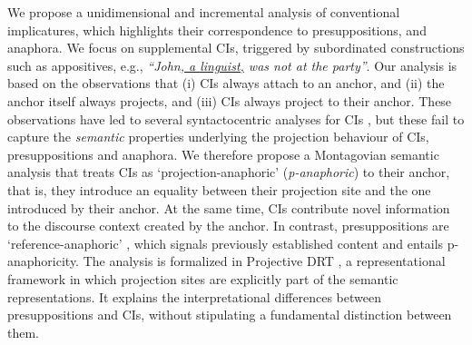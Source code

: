 \documentclass[letterpaper,11pt]{article}
\begin{document}
We propose a unidimensional and incremental analysis of conventional
implicatures, which highlights their correspondence to presuppositions, and
anaphora.  We focus on supplemental CIs, triggered by subordinated
constructions such as appositives, e.g., \emph{``John\underline{,
a linguist,} was not at the party''}. Our analysis is based on the
observations that (i) CIs always attach to an anchor, and (ii) the anchor
itself always projects, and (iii) CIs always project to their anchor.  These
observations have led to several syntactocentric analyses for CIs
\cite[e.g.,][]{nouwen2007appositives-short,schlenker2013supplements,nouwen2014note-short},
but these fail to capture the \emph{semantic} properties underlying the
projection behaviour of CIs, presuppositions and anaphora. We therefore
propose a Montagovian semantic analysis that treats CIs as
`projection-anaphoric' (\emph{p-anaphoric}) to their anchor, that is, they
introduce an equality between their projection site and the one introduced
by their anchor. At the same time, CIs contribute novel information to the
discourse context created by the anchor. In contrast, presuppositions are
`reference-anaphoric' \citep[cf.][]{sandt1992presupposition-short}, which
signals previously established content and entails p-anaphoricity. The
analysis is formalized in Projective DRT \cite{venhuizen2013iwcs-short},
a representational framework in which projection sites are explicitly part
of the semantic representations. It explains the interpretational
differences between presuppositions and CIs, without stipulating
a fundamental distinction between them.

\end{document}
